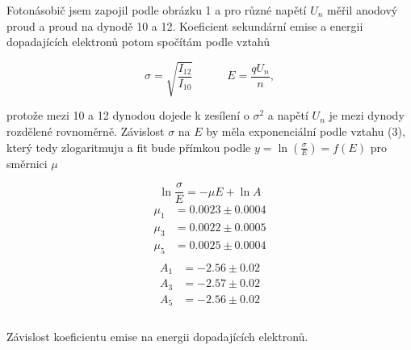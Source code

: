 \documentclass[a4paper,11pt]{article}
\begin{document}
Fotonásobič jsem zapojil podle obrázku 1 a pro různé napětí $ U_n $ měřil anodový proud a proud na dynodě 10 a 12. Koeficient sekundární emise a energii dopadajících elektronů potom spočítám podle vztahů

\begin{equation}
\sigma = \sqrt{\frac{I_{12}}{I_{10}}} \quad \quad  \quad E = \frac{q U_n}{n},
\end{equation}

\noindent
protože mezi 10 a 12 dynodou dojede k zesílení o $ \sigma^{2} $ a napětí $ U_n $  je mezi dynody rozdělené rovnoměrně. Závislost $ \sigma $ na $ E $ by měla exponenciální podle vztahu (3), který tedy zlogaritmuju a fit bude přímkou podle $ y = \ln (\frac{\sigma}{E}) = f(E) $ pro směrnici $ \mu $ 

\begin{table}[htpb]
    \begin{minipage}[b]{.35\linewidth}
        \centering
        \begin{equation}
            \ln \frac{\sigma}{E} = -\mu E + \ln A
        \end{equation}
        \begin{align*}
            \mu_1 &= 0.0023 \pm 0.0004 \\
            \mu_3 &= 0.0022  \pm 0.0005  \\
            \mu_5 &= 0.0025 \pm 0.0004 \\
        \end{align*}
        \vspace{-30pt}
        \begin{align*}
            A_1 &= -2.56 \pm 0.02 \\
            A_3 &= -2.57 \pm 0.02 \\
            A_5 &= -2.56 \pm 0.02 \\
            \\
        \end{align*}
    \end{minipage} 
    \hfill
    \begin{minipage}[b]{.60\linewidth}
        \centering
        
        \captionsetup{type=graph}
        \caption{Závislost koeficientu emise na energii dopadajících elektronů.}
    \end{minipage} 
\end{table}

\vspace{-10pt}
\end{document}
